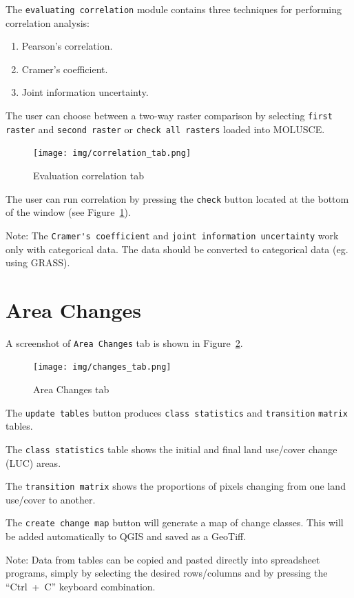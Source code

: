 \documentclass{report}
\begin{document}
The \verb+evaluating correlation+ module contains three techniques for performing correlation analysis:
\begin{enumerate}
  \item Pearson's correlation.
  \item Cramer's coefficient.
  \item Joint information uncertainty.
\end{enumerate}

The user can choose between a two-way raster comparison by selecting \verb+first raster+ and \verb+second raster+
or \verb+check all rasters+ loaded into MOLUSCE.

\begin{figure}[h!]
\centering
\texttt{[image: img/correlation\_tab.png]}
\caption{Evaluation correlation tab}
\label{fig:correlation_tab}
\end{figure}

The user can run correlation by pressing the \verb+check+ button located at the bottom of the window (see Figure~\ref{fig:correlation_tab}).

Note: The \verb+Cramer's coefficient+ and \verb+joint information uncertainty+ work only with categorical data.
The data should be converted to categorical data (eg. using GRASS).

\section{Area Changes}

A screenshot of \verb+Area Changes+ tab is shown in Figure~\ref{fig:changes_tab}.

\begin{figure}[h!]
\centering
\texttt{[image: img/changes\_tab.png]}
\caption{Area Changes tab}
\label{fig:changes_tab}
\end{figure}

The \verb+update tables+ button produces \verb+class statistics+ and \verb+transition+ \verb+matrix+ tables.

The \verb+class statistics+ table shows the initial and final land use/cover change (LUC) areas.

The \verb+transition matrix+ shows the proportions of pixels changing from one land use/cover to another.

The \verb+create change map+ button will generate a map of change classes. This will be added
automatically to QGIS and saved as a GeoTiff.

Note: Data from tables can be copied and pasted directly into spreadsheet programs, simply by
selecting the desired rows/columns and by pressing the “Ctrl~+~C” keyboard combination.
\end{document}
